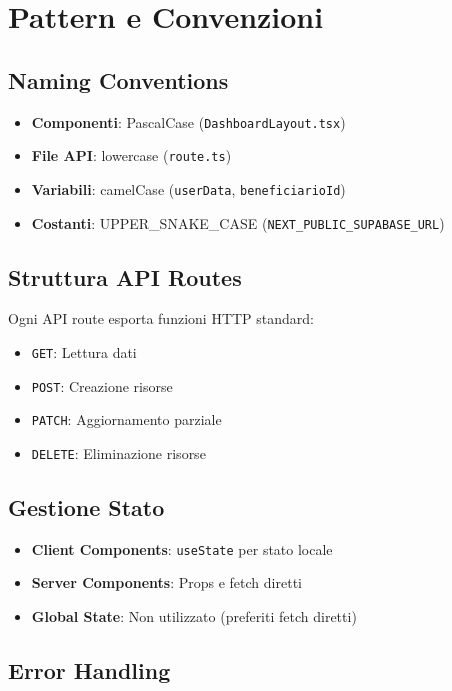 \documentclass{article}
\begin{document}
\section{Pattern e Convenzioni}

\subsection{Naming Conventions}

\begin{itemize}
\item \textbf{Componenti}: PascalCase (\texttt{DashboardLayout.tsx})
\item \textbf{File API}: lowercase (\texttt{route.ts})
\item \textbf{Variabili}: camelCase (\texttt{userData}, \texttt{beneficiarioId})
\item \textbf{Costanti}: UPPER\_SNAKE\_CASE (\texttt{NEXT\_PUBLIC\_SUPABASE\_URL})
\end{itemize}

\subsection{Struttura API Routes}

Ogni API route esporta funzioni HTTP standard:
\begin{itemize}
\item \texttt{GET}: Lettura dati
\item \texttt{POST}: Creazione risorse
\item \texttt{PATCH}: Aggiornamento parziale
\item \texttt{DELETE}: Eliminazione risorse
\end{itemize}

\subsection{Gestione Stato}

\begin{itemize}
\item \textbf{Client Components}: \texttt{useState} per stato locale
\item \textbf{Server Components}: Props e fetch diretti
\item \textbf{Global State}: Non utilizzato (preferiti fetch diretti)
\end{itemize}

\subsection{Error Handling}
\end{document}
